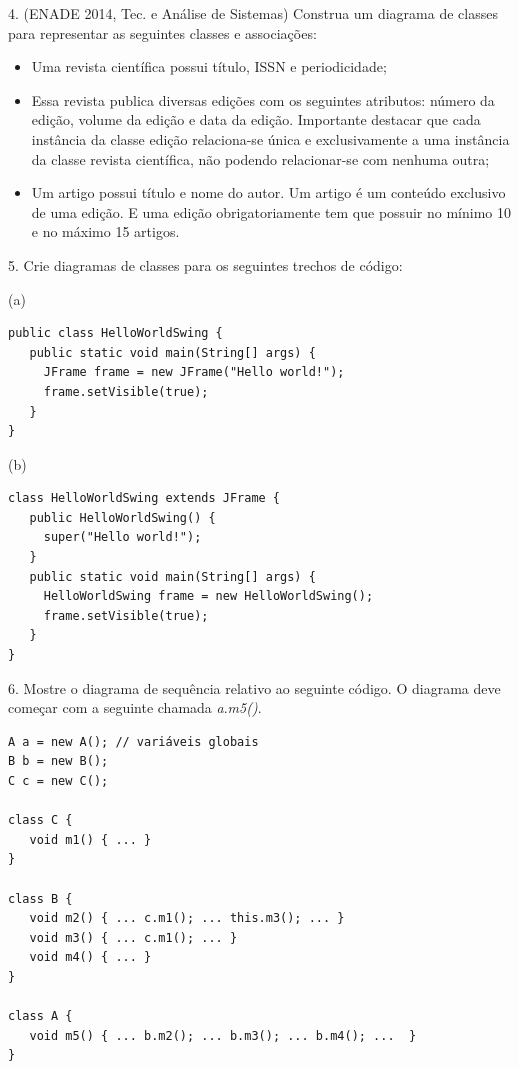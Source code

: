 \documentclass[
  11pt,
  twoside]{book}
\begin{document}
4. (ENADE 2014, Tec. e Análise de Sistemas) Construa um diagrama de
classes para representar as seguintes classes e associações:

\begin{itemize}
\item
  Uma revista científica possui título, ISSN e periodicidade;
\item
  Essa revista publica diversas edições com os seguintes atributos:
  número da edição, volume da edição e data da edição. Importante
  destacar que cada instância da classe edição relaciona-se única e
  exclusivamente a uma instância da classe revista científica, não
  podendo relacionar-se com nenhuma outra;
\item
  Um artigo possui título e nome do autor. Um artigo é um conteúdo
  exclusivo de uma edição. E uma edição obrigatoriamente tem que possuir
  no mínimo 10 e no máximo 15 artigos.
\end{itemize}

5. Crie diagramas de classes para os seguintes trechos de código:

(a)

\begin{lstlisting}
public class HelloWorldSwing { 
   public static void main(String[] args) {
     JFrame frame = new JFrame("Hello world!");
     frame.setVisible(true);
   }
}
\end{lstlisting}

(b)

\begin{lstlisting}
class HelloWorldSwing extends JFrame {
   public HelloWorldSwing() {
     super("Hello world!");
   }
   public static void main(String[] args) {
     HelloWorldSwing frame = new HelloWorldSwing();
     frame.setVisible(true);
   }
}
\end{lstlisting}

6. Mostre o diagrama de sequência relativo ao seguinte código. O
diagrama deve começar com a seguinte chamada \emph{a}.\emph{m5()}.

\begin{lstlisting}
A a = new A(); // variáveis globais
B b = new B();
C c = new C();

class C { 
   void m1() { ... } 
}

class B { 
   void m2() { ... c.m1(); ... this.m3(); ... }   
   void m3() { ... c.m1(); ... }
   void m4() { ... }
}

class A { 
   void m5() { ... b.m2(); ... b.m3(); ... b.m4(); ...  }   
}     
\end{lstlisting}
\end{document}
